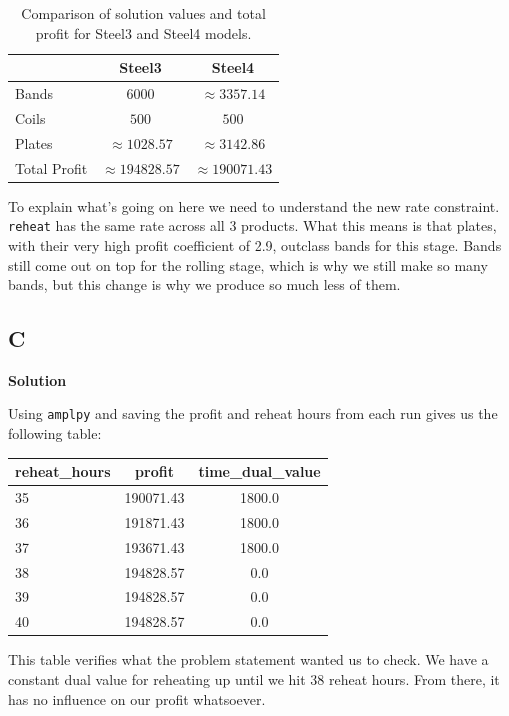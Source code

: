 \begin{table}[h!]
\centering
\begin{tabular}{lcc}
\hline
 & \textbf{Steel3} & \textbf{Steel4} \\
\hline
Bands  & $6000$       & $\approx 3357.14$ \\
Coils  & $500$        & $500$ \\
Plates & $\approx 1028.57$ & $\approx 3142.86$ \\
Total Profit & $\approx 194828.57$ & $\approx 190071.43$ \\
\hline
\end{tabular}
\caption{Comparison of solution values and total profit for Steel3 and Steel4 models.}
\end{table}

To explain what's going on here we need to understand the new rate constraint. \texttt{reheat} has the same rate across all 3 products. What this means is that plates, with their very high profit coefficient of 2.9, outclass bands for this stage. Bands still come out on top for the rolling stage, which is why we still make so many bands, but this change is why we produce so much less of them.

\subsection*{C}

\noindent\textbf{Solution}

Using \texttt{amplpy} and saving the profit and reheat hours from each run gives us the following table:

\begin{table}[!ht]
    \centering
    \begin{tabular}{lcc}
    \hline
        reheat\_hours & profit & time\_dual\_value \\ \hline
        35 & 190071.43 & 1800.0 \\
        36 & 191871.43 & 1800.0 \\
        37 & 193671.43 & 1800.0 \\
        38 & 194828.57 & 0.0 \\
        39 & 194828.57 & 0.0 \\
        40 & 194828.57 & 0.0 \\
    \hline
    \end{tabular}
\end{table}


This table verifies what the problem statement wanted us to check. We have a constant dual value for reheating up until we hit 38 reheat hours. From there, it has no influence on our profit whatsoever. 

